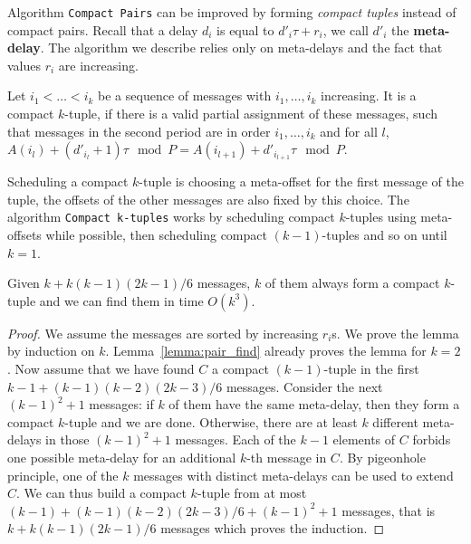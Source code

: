 \documentclass[a4paper,UKenglish,cleveref, autoref, thm-restate]{lipics-v2019}
\newcommand\compactpair{\texttt{Compact Pairs}\xspace}
\begin{document}
Algorithm \compactpair can be improved by forming \emph{compact tuples} instead of compact pairs. Recall that a delay $d_i$ is equal to  $d'_i\tau + r_i$, we call $d'_i$ the \textbf{meta-delay}. The algorithm we describe relies only on meta-delays and the fact that values $r_i$ are increasing.

\begin{definition}
Let $i_1 < \dots < i_k$ be a sequence of messages with $i_1,\dots,i_k$ increasing. 
It is a compact $k$-tuple, if there is a valid partial assignment of these messages, such that messages in the second period are in order $i_1,\dots,i_k$ and for all $l$, $A(i_l) + (d'_{i_l} + 1)\tau \mod P = A(i_{l+1}) + d'_{i_{l+1}}\tau \mod P$.
\end{definition}

 Scheduling a compact $k$-tuple is choosing a meta-offset for the first message of the tuple, the offsets of the other messages are also fixed by this choice.  
The algorithm \texttt{Compact k-tuples} works by scheduling compact $k$-tuples using meta-offsets while possible, then scheduling compact $(k-1)$-tuples and so on until $k=1$.


\begin{lemma}\label{lemma:uple_find}
Given $k + k(k-1)(2k-1)/6$ messages, $k$ of them always form a compact $k$-tuple and we can find them in time $O(k^3)$. 
\end{lemma}
\begin{proof}
We assume the messages are sorted by increasing $r_i$s. We prove the lemma by induction on $k$. Lemma~\ref{lemma:pair_find} already proves the lemma for $k=2$.
Now assume that we have found $C$ a compact $(k-1)$-tuple in the first $k-1 + (k-1)(k-2)(2k-3)/6$ messages. Consider the next $(k-1)^2 + 1$ messages: if $k$ of them have the same meta-delay, then they form a compact $k$-tuple and we are done. Otherwise, there are at least $k$ different meta-delays in those $(k-1)^2 + 1$ messages. Each of the $k-1$ elements of $C$ forbids one possible meta-delay for an additional $k$-th message in $C$. By pigeonhole principle, one of the $k$ messages with distinct meta-delays can be used to extend $C$. We can thus build a compact $k$-tuple from at most $(k-1) + (k-1)(k-2)(2k-3)/6 + (k-1)^2 + 1$ messages, that is $k + k(k-1)(2k-1)/6$ messages which proves the induction.
\end{proof}
\end{document}
